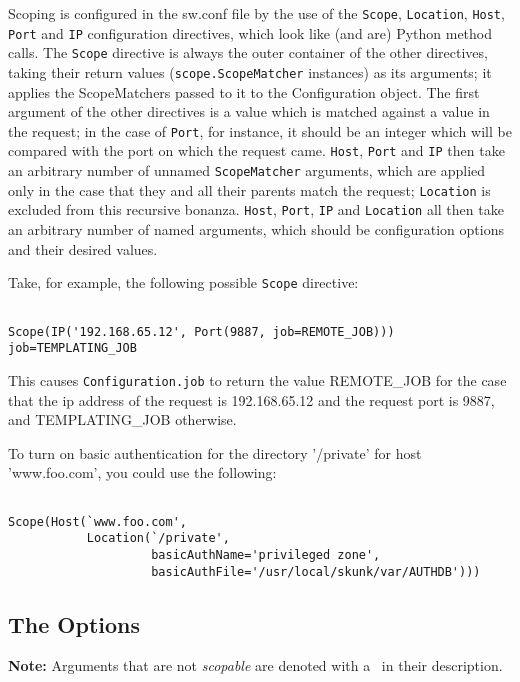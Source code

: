 \documentclass[titlepage]{manual}
\begin{document}
Scoping is configured in the sw.conf file by the use of the \texttt{Scope}, \texttt{Location}, \texttt{Host}, 
\texttt{Port} and \texttt{IP} configuration directives, which look like (and are) Python method calls.  The 
\texttt{Scope} directive 
is always the outer container of the other directives, taking their return values (\texttt{scope.ScopeMatcher}
instances) as its arguments; it applies the ScopeMatchers passed to it to the Configuration object.  
The first argument of the other directives is a value which is matched against a value 
in the request; in the case of \texttt{Port}, for instance, it should be an integer which will be 
compared with the 
port on which the request came.  \texttt{Host}, \texttt{Port} and \texttt{IP} then take an arbitrary 
number of unnamed \texttt{ScopeMatcher}
arguments, which are applied only in the case that they and all their parents match the request; 
\texttt{Location} is excluded from this recursive bonanza.  
\texttt{Host}, \texttt{Port}, \texttt{IP} and \texttt{Location} all then take an arbitrary 
number of named arguments, which should be configuration options and their desired values.

Take, for example, the following possible \texttt{Scope} directive:

\begin{verbatim}

Scope(IP('192.168.65.12', Port(9887, job=REMOTE_JOB)))
job=TEMPLATING_JOB

\end{verbatim}
This causes \texttt{Configuration.job} to return the value REMOTE_JOB for the case that the ip address of the 
request is 192.168.65.12 and the request port is 9887, and TEMPLATING_JOB otherwise.
 
To turn on basic authentication for the directory '/private' for host 'www.foo.com', you could
use the following:
\begin{verbatim}

Scope(Host(`www.foo.com', 
           Location(`/private',
                    basicAuthName='privileged zone',
                    basicAuthFile='/usr/local/skunk/var/AUTHDB')))

\end{verbatim}	

\subsection{The Options}
\textbf{Note:} Arguments that are not \emph{scopable} are denoted with a 
\nonscope\ in their description.
\end{document}
